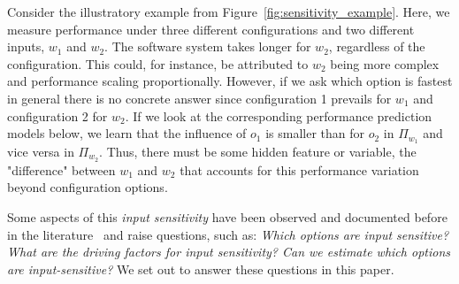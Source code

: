 {{\color{blue!80!black} Consider the illustratory example from Figure~\ref{fig:sensitivity_example}. Here, we measure performance under three different configurations and two different inputs, $w_1$ and $w_2$. The software system takes longer for $w_2$, regardless of the configuration. This could, for instance, be attributed to $w_2$ being more complex and performance scaling proportionally. However, if we ask which option is fastest in general there is no concrete answer since configuration 1 prevails for $w_1$ and configuration 2 for $w_2$. If we look at the corresponding performance prediction models below, we learn that the influence of $o_1$ is smaller than for $o_2$ in $\Pi_{w_1}$ and vice versa in $\Pi_{w_2}$. Thus, there must be some hidden feature or variable, the "difference" between $w_1$ and $w_2$ that accounts for this performance variation beyond configuration options.
}



Some aspects of this \emph{input sensitivity} have been observed and documented before in the literature~\cite{liao_2020_using_emse,alves_sampling_2020,jamishidi_transfer_2017} and raise questions, such as: \textit{Which options are input sensitive? What are the driving factors for input sensitivity? Can we estimate which options are input-sensitive?} We set out to answer these questions in this paper.
	
}
